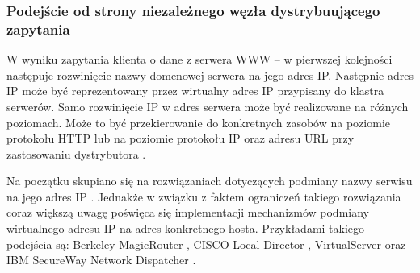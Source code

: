 \subsubsection{Podejście od strony niezależnego węzła dystrybuującego zapytania}

W wyniku zapytania klienta o dane z serwera WWW -- w pierwszej kolejności następuje rozwinięcie nazwy domenowej serwera na
jego adres IP. Następnie adres IP może być reprezentowany przez wirtualny adres IP przypisany do klastra serwerów. Samo
rozwinięcie IP w adres serwera może być realizowane na różnych poziomach. Może to być przekierowanie do konkretnych zasobów na 
poziomie protokołu HTTP \cite{modele2} lub na poziomie protokołu IP oraz adresu URL przy zastosowaniu 
dystrybutora \cite{modele1,gliwice3}.

Na początku skupiano się na rozwiązaniach dotyczących podmiany nazwy serwisu na jego adres IP \cite{gliwice4}. Jednakże w 
związku z faktem ograniczeń takiego rozwiązania coraz większą uwagę poświęca się implementacji mechanizmów podmiany 
wirtualnego adresu IP na adres konkretnego hosta. Przykładami takiego podejścia są: Berkeley MagicRouter \cite{modele1}, 
CISCO Local Director \cite{gliwice13}, VirtualServer \cite{virtualserver} oraz IBM SecureWay Network Dispatcher \cite{GettingStarted}.

